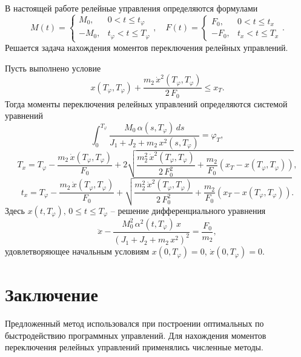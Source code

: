 В настоящей работе релейные управления определяются формулами
\begin{equation*}
	M(t) =
	 		\begin{cases}
			M_0, & 0 < t \leq t_{\varphi}\\
			- M_0, & t_{\varphi} < t \leq T_{\varphi} 
		\end{cases},
	\quad
	F(t) =
		\begin{cases}
			F_0, & 0 < t \leq t_x\\
			- F_0, & t_x < t \leq T_x 
		\end{cases}.
\end{equation*}
Решается задача нахождения моментов переключения релейных управлений.

\begin{theorem} Пусть выполнено условие
\begin{equation*}
	x(T_{\varphi}, T_{\varphi}) + \frac{m_2\,\dot{x}^2 (T_{\varphi}, T_{\varphi})}{2 \,F_0} \leq x_T.
\end{equation*}
Тогда моменты переключения релейных управлений определяются системой уравнений
\begin{equation*}
\int_{0}^{T_{\varphi}} \frac{M_0 \, \alpha(s, T_{\varphi})\,ds}{J_1 + J_2 + m_2\,x^2(s, T_{\varphi})}=\varphi_T,
\end{equation*}
\begin{equation*}
	T_x = T_{\varphi} - \frac{m_2\, \dot{x}(T_{\varphi}, T_{\varphi})}{F_0} + 2 \sqrt{\frac{m_2^2\, \dot{x}^2(T_{\varphi}, T_{\varphi})}{2\,F_0^2} + \frac{m_2}{F_0}\left( x_T - x(T_{\varphi}, T_{\varphi}) \right)},
\end{equation*}
\begin{equation*}
	t_x = T_{\varphi} - \frac{m_2\, \dot{x}(T_{\varphi}, T_{\varphi})}{F_0} +  \sqrt{\frac{m_2^2\, \dot{x}^2(T_{\varphi}, T_{\varphi})}{2\,F_0^2} + \frac{m_2}{F_0}\left( x_T - x(T_{\varphi}, T_{\varphi}) \right)}.
\end{equation*}
Здесь $x(t, T_{\varphi}), \, 0 \leq t \leq T_{\varphi}$ -- решение дифференциального уравнения 
\begin{equation*}
	\ddot{x} - \frac{M_0^2\,\alpha^2(t, T_{\varphi})\,x}{\left(J_1 + J_2 + m_2\,x^2 \right)^2} = \frac{F_0}{m_2},
\end{equation*}
удовлетворяющее начальным условиям $x(0, T_{\varphi}) = 0$, $\dot{x}(0, T_{\varphi}) = 0$.
\end{theorem}

\section{Заключение} 
Предложенный метод использовался при построении оптимальных по быстродействию программных управлений. Для нахождения моментов переключения релейных управлений применялись численные методы.

